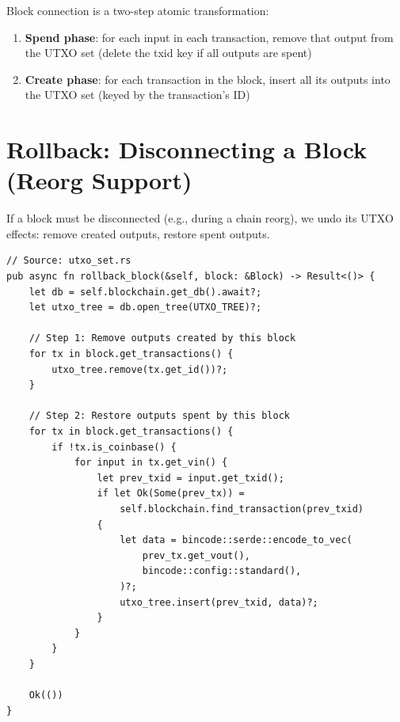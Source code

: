 \begin{notebox}
Block connection is a two-step atomic transformation:
\begin{enumerate}
  \item \textbf{Spend phase}: for each input in each transaction, remove that output from the UTXO set (delete the txid key if all outputs are spent)
  \item \textbf{Create phase}: for each transaction in the block, insert all its outputs into the UTXO set (keyed by the transaction's ID)
\end{enumerate}
\end{notebox}

\section{Rollback: Disconnecting a Block (Reorg Support)}
\label{sec:ch09-4-rollback}

If a block must be disconnected (e.g., during a chain reorg), we undo its UTXO effects: remove created outputs, restore spent outputs.

\begin{listing}[htbp]
\caption{Rollback the UTXO set when a block is disconnected}
\label{lst:ch09-4-7}
\begin{verbatim}
// Source: utxo_set.rs
pub async fn rollback_block(&self, block: &Block) -> Result<()> {
    let db = self.blockchain.get_db().await?;
    let utxo_tree = db.open_tree(UTXO_TREE)?;

    // Step 1: Remove outputs created by this block
    for tx in block.get_transactions() {
        utxo_tree.remove(tx.get_id())?;
    }

    // Step 2: Restore outputs spent by this block
    for tx in block.get_transactions() {
        if !tx.is_coinbase() {
            for input in tx.get_vin() {
                let prev_txid = input.get_txid();
                if let Ok(Some(prev_tx)) =
                    self.blockchain.find_transaction(prev_txid)
                {
                    let data = bincode::serde::encode_to_vec(
                        prev_tx.get_vout(),
                        bincode::config::standard(),
                    )?;
                    utxo_tree.insert(prev_txid, data)?;
                }
            }
        }
    }

    Ok(())
}
\end{verbatim}
\end{listing}

